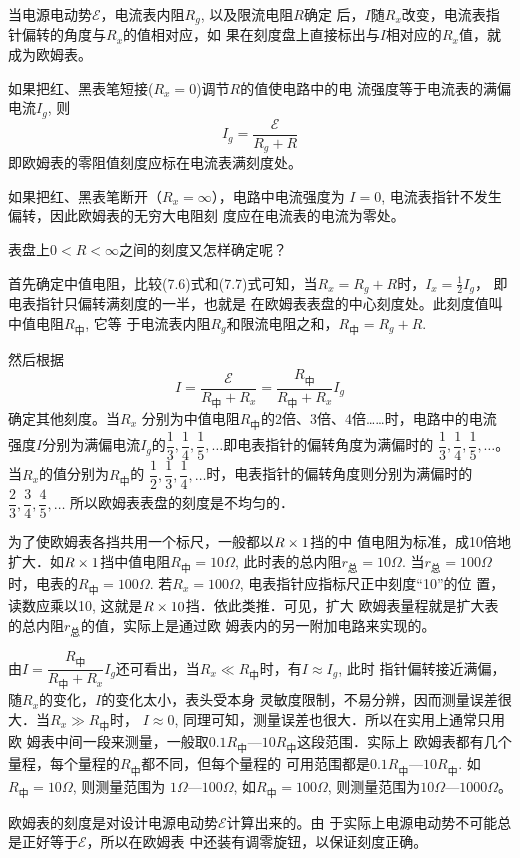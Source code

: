 当电源电动势$\mathcal{E}$，电流表内阻$R_g$, 以及限流电阻$R$确定
后，$I$随$R_x$改变，电流表指针偏转的角度与$R_x$的值相对应，如
果在刻度盘上直接标出与$I$相对应的$R_x$值，就成为欧姆表。

如果把红、黑表笔短接($R_x=0$)调节$R$的值使电路中的电
流强度等于电流表的满偏电流$I_g$, 则
\begin{equation}
    I_g=\frac{\mathcal{E}}{R_g+R}
\end{equation}
即欧姆表的零阻值刻度应标在电流表满刻度处。

如果把红、黑表笔断开（$R_x=\infty$），电路中电流强度为
$I=0$, 电流表指针不发生偏转，因此欧姆表的无穷大电阻刻
度应在电流表的电流为零处。

表盘上$0<R<\infty$之间的刻度又怎样确定呢？

首先确定中值电阻，比较(7.6)式和(7.7)式可知，当$R_x=R_g+R$时，$I_x=\frac{1}{2}I_g$，
即电表指针只偏转满刻度的一半，也就是
在欧姆表表盘的中心刻度处。此刻度值叫中值电阻$R_{\text{中}}$, 它等
于电流表内阻$R_g$和限流电阻之和，$R_{\text{中}}=R_g+R$.

然后根据
\[I=\frac{\mathcal{E}}{R_{\text{中}}+R_x}=\frac{R_{\text{中}}}{R_{\text{中}}+R_x}I_g\]
确定其他刻度。当$R_x$
分别为中值电阻$R_{\text{中}}$的2倍、3倍、4倍……时，电路中的电流
强度$I$分别为满偏电流$I_g$的$\dfrac{1}{3},\dfrac{1}{4},\dfrac{1}{5},\ldots$即电表指针的偏转角度为满偏时的
$\dfrac{1}{3},\dfrac{1}{4},\dfrac{1}{5},\ldots$。
当$R_x$的值分别为$R_{\text{中}}$的
$\dfrac{1}{2},\dfrac{1}{3},\dfrac{1}{4},\ldots$时，电表指针的偏转角度则分别为满偏时的$\dfrac{2}{3},\dfrac{3}{4},\dfrac{4}{5},\ldots$
所以欧姆表表盘的刻度是不均匀的．

为了使欧姆表各挡共用一个标尺，一般都以$R\times1$挡的中
值电阻为标准，成10倍地扩大．如$R\times1$挡中值电阻$R_{\text{中}}=
10\Omega$, 此时表的总内阻$r_{\text{总}}=10\Omega$. 当$r_{\text{总}}=100\Omega$时，电表的$R_{\text{中}}=
100\Omega$. 若$R_x=100\Omega$, 电表指针应指标尺正中刻度“10”的位
置，读数应乘以10, 这就是$R\times10$挡．依此类推．可见，扩大
欧姆表量程就是扩大表的总内阻$r_{\text{总}}$的值，实际上是通过欧
姆表内的另一附加电路来实现的。

由$I=\dfrac{R_{\text{中}}}{R_{\text{中}}+R_x}I_g$还可看出，当$R_x\ll R_{\text{中}}$时，有$I\approx I_g$, 此时
指针偏转接近满偏，随$R_x$的变化，$I$的变化太小，表头受本身
灵敏度限制，不易分辨，因而测量误差很大．当$R_x\gg R_{\text{中}}$时，
$I\approx 0$, 同理可知，测量误差也很大．所以在实用上通常只用欧
姆表中间一段来测量，一般取$0.1R_{\text{中}}$—$10R_{\text{中}}$这段范围．实际上
欧姆表都有几个量程，每个量程的$R_{\text{中}}$都不同，但每个量程的
可用范围都是$0.1R_{\text{中}}$—$10R_{\text{中}}$. 如$R_{\text{中}}=10\Omega$, 则测量范围为
$1\Omega$—$100\Omega$, 如$R_{\text{中}}=100\Omega$, 则测量范围为$10\Omega$—$1000\Omega$。

欧姆表的刻度是对设计电源电动势$\mathcal{E}$计算出来的。由
于实际上电源电动势不可能总是正好等于$\mathcal{E}$，所以在欧姆表
中还装有调零旋钮，以保证刻度正确。



